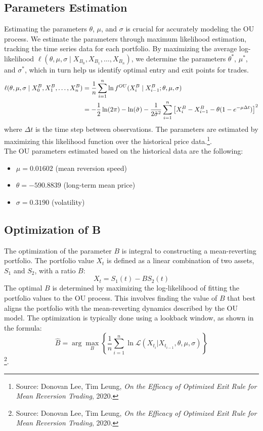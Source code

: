 \documentclass{article}
\begin{document}
\subsection*{Parameters Estimation}
Estimating the parameters \( \theta \), \( \mu \), and \( \sigma \) is crucial for accurately modeling the OU process. We estimate the parameters through maximum likelihood estimation, tracking the time series data for each portfolio. By maximizing the average log-likelihood $\ell(\theta, \mu, \sigma \mid X_{B_0}, X_{B_1}, \ldots, X_{B_n})$, we determine the parameters $\theta^*$, $\mu^*$, and $\sigma^*$, which in turn help us identify optimal entry and exit points for trades.
\begin{align}
\ell(\theta, \mu, \sigma \mid X_0^B, X_1^B, \ldots, X_n^B) &= \frac{1}{n} \sum_{i=1}^n \ln f^{OU}(X_i^B \mid X_{i-1}^B; \theta, \mu, \sigma) \notag \\
&= -\frac{1}{2} \ln(2\pi) - \ln(\tilde{\sigma}) - \frac{1}{2 \tilde{\sigma}^2} \sum_{i=1}^n \left[ X_i^B - X_{i-1}^B - \theta (1 - e^{-\mu \Delta t}) \right]^2
\end{align}
where \( \Delta t \) is the time step between observations. The parameters are estimated by maximizing this likelihood function over the historical price data.\footnote{Source: Donovan Lee, Tim Leung, \textit{On the Efficacy of Optimized Exit Rule for Mean Reversion Trading}, 2020.}.\\

The OU parameters estimated based on the historical data are the following:
\begin{itemize}
    \item $\mu = 0.01602$ \quad (mean reversion speed)
    \item $\theta = -590.8839$ \quad (long-term mean price)
    \item $\sigma = 0.3190$ \quad (volatility)
\end{itemize}

\subsection*{Optimization of B}
The optimization of the parameter \( B \) is integral to constructing a mean-reverting portfolio. The portfolio value \( X_t \) is defined as a linear combination of two assets, \( S_1 \) and \( S_2 \), with a ratio \( B \):
\begin{equation}
X_t = S_1(t) - B S_2(t)
\end{equation}
The optimal \( B \) is determined by maximizing the log-likelihood of fitting the portfolio values to the OU process. This involves finding the value of \( B \) that best aligns the portfolio with the mean-reverting dynamics described by the OU model. The optimization is typically done using a lookback window, as shown in the formula:
\begin{equation}
\hat{B} = \arg \max_{B} \left\{ \frac{1}{n} \sum_{i=1}^{n} \ln \mathcal{L} \left( X_{t_i} | X_{t_{i-1}}, \theta, \mu, \sigma \right) \right\}
\end{equation} \footnote{Source: Donovan Lee, Tim Leung, \textit{On the Efficacy of Optimized Exit Rule for Mean Reversion Trading}, 2020.}.\\
\end{document}
